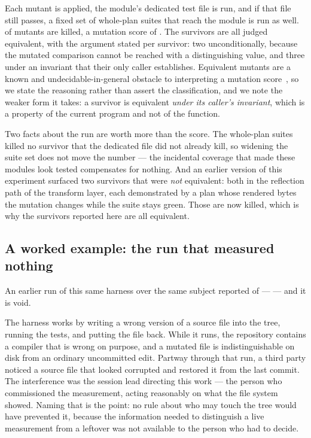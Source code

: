 \documentclass[10pt,journal,compsoc]{IEEEtran}
\begin{document}
Each mutant is applied, the module's dedicated test file is run, and if that file still passes,
a fixed set of whole-plan suites that reach the module is run as well. \factMutantsKilled{} of
\factMutants{} mutants are killed, a mutation score of \factMutantScore{}. The
\factMutantsSurvived{} survivors are all judged equivalent, with the argument stated per
survivor: two unconditionally, because the mutated comparison cannot be reached with a
distinguishing value, and three under an invariant that their only caller establishes. Equivalent
mutants are a known and undecidable-in-general obstacle to interpreting a mutation
score~\cite{papadakis2019mutationadvances}, so we state the reasoning rather than assert the
classification, and we note the weaker form it takes: a survivor is equivalent \emph{under its
caller's invariant}, which is a property of the current program and not of the function.

Two facts about the run are worth more than the score. The whole-plan suites killed no survivor
that the dedicated file did not already kill, so widening the suite set does not move the number
--- the incidental coverage that made these modules look tested compensates for nothing. And an
earlier version of this experiment surfaced two survivors that were \emph{not} equivalent: both
in the reflection path of the transform layer, each demonstrated by a plan whose rendered bytes
the mutation changes while the suite stays green. Those are now killed, which is why the
survivors reported here are all equivalent.

\subsection{A worked example: the run that measured nothing}

An earlier run of this same harness over the same subject reported \factMutantsVoidKilled{} of
\factMutants{} --- \factMutantScoreVoid{} --- and it is void.

The harness works by writing a wrong version of a source file into the tree, running the tests,
and putting the file back. While it runs, the repository contains a compiler that is wrong on
purpose, and a mutated file is indistinguishable on disk from an ordinary uncommitted edit.
Partway through that run, a third party noticed a source file that looked corrupted and restored
it from the last commit. The interference was the session lead directing this work --- the person
who commissioned the measurement, acting reasonably on what the file system showed. Naming that
is the point: no rule about who may touch the tree would have prevented it, because the
information needed to distinguish a live measurement from a leftover was not available to the
person who had to decide.
\end{document}

